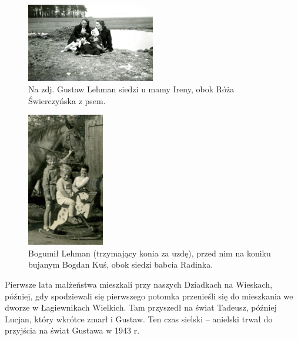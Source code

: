\begin{figure}[!h]
\begin{center}
\includegraphics[width=0.5\textwidth]{photo/gustaw_lehman_1.jpg}
\caption[Gustaw Lehman]{Na zdj. Gustaw Lehman siedzi u mamy Ireny, obok Róża Świerczyńska z psem.}
\label{rys:gustaw_lehman_1}
\end{center}
\end{figure}

\begin{figure}[!h]
\begin{center}
\includegraphics[width=0.3\textwidth]{photo/bogumil_lehman_1.jpg}
\caption[Bogumił Lehman]{Bogumił Lehman (trzymający konia za uzdę), przed nim na koniku bujanym Bogdan Kuś, obok siedzi babcia Radinka.}
\label{rys:bogumil_lehman_1}
\end{center}
\end{figure}

Pierwsze lata małżeństwa mieszkali przy naszych Dziadkach na Wieskach, później, gdy spodziewali się pierwszego potomka przenieśli się do mieszkania we dworze w Łagiewnikach Wielkich. Tam przyszedł na świat Tadeusz, później Lucjan, który wkrótce zmarł i Gustaw. Ten czas sielski – anielski trwał do przyjścia na świat Gustawa w 1943 r.


